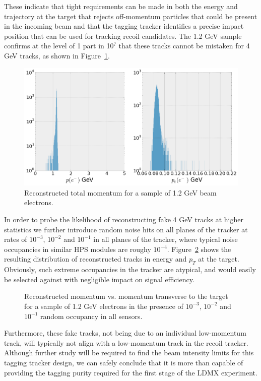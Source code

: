 These indicate that tight requirements can be made in both the energy and trajectory at the target that rejects off-momentum particles that could be present in the incoming beam and that the tagging tracker identifies a precise impact position that can be used for tracking recoil candidates.  The 1.2 GeV sample confirms at the level of 1 part in 10$^?$ that these tracks cannot be mistaken for 4 GeV tracks, as shown in Figure~\ref{fig:tracking_1pt2gev}.  
\begin{figure}[htp]
    \centering
    \includegraphics[width=\textwidth]{images/tagger_tracker_p_pt_1pt2_gev.png}
    \caption{\small{Reconstructed total momentum for a sample of 1.2 GeV beam 
                    electrons.}}
    \label{fig:tracking_1pt2gev}
\end{figure}
In order to probe the likelihood of reconstructing fake 4 GeV tracks at higher statistics we further introduce random noise hits on all planes of the tracker at rates of $10^{-3}$, $10^{-2}$ and $10^{-1}$ in all planes of the tracker, where typical noise occupancies in similar HPS modules are roughy $10^{-4}$. Figure~\ref{fig:tracking_1pt2gev_noise} shows the resulting distribution of reconstructed tracks in energy and $p_T$ at the target. Obviously, such extreme occupancies in the tracker are atypical, and would easily be selected against with negligible impact on signal efficiency. 
\begin{figure}[htp]
    \centering
    \caption{\small{Reconstructed momentum vs. momentum transverse to the target for a sample of 1.2 GeV electrons in the presence of $10^{-3}$, $10^{-2}$ and $10^{-1}$ random occupancy in all sensors.} }
    \label{fig:tracking_1pt2gev_noise}
\end{figure}
Furthermore, these fake tracks, not being due to an individual low-momentum track, will typically not align with a low-momentum track in the recoil tracker.  Although further study will be required to find the beam intensity limits for this tagging tracker design, we can safely conclude that it is more than capable of providing the tagging purity required for the first stage of the LDMX experiment.


